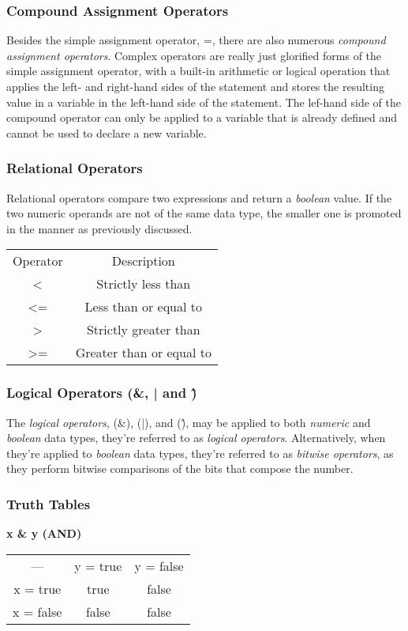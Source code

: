 \documentclass{article}
\begin{document}
\subsubsection{Compound Assignment Operators}
Besides the simple assignment operator, =, there are also numerous \emph{compound assignment operators}. 
Complex operators are really just glorified forms of the simple assignment operator, with a built-in arithmetic or logical operation that applies the left- and right-hand sides of the statement and stores the resulting value in a variable in the left-hand side of the statement.
The lef-hand side of the compound operator can only be applied to a variable that is already defined and cannot be used to declare a new variable.

\subsubsection{Relational Operators}
Relational operators compare two expressions and return a \emph{boolean} value. If the two numeric operands are not of the same data type, the smaller one is promoted in the manner as previously discussed.

\begin{tabular}{|c|c|}
	\cline{1-2}
	Operator & Description \\
	\cline{1-2}
	< & Strictly less than \\
	<= & Less than or equal to \\
	> & Strictly greater than \\
	>= & Greater than or equal to \\
	\cline{1-2}
\end{tabular}

\subsubsection{Logical Operators (\&, | and \^)}
The \emph{logical operators}, (\&), (|), and (\^), may be applied to both \emph{numeric} and \emph{boolean} data types, they're referred to as \emph{logical operators}. 
Alternatively, when they're applied to \emph{boolean} data types, they're referred to as \emph{bitwise operators}, as they perform bitwise comparisons of the bits that compose the number.
\subsubsection{Truth Tables}
\textbf{x \& y (AND)}
\begin{tabular}{|c|c|c|}
	\cline{1-3}
	--- & y = true & y = false \\
	\cline{1-3}
	x = true & true & false \\
	\cline{1-3}
	x = false & false & false \\
	\cline{1-3}
\end{tabular}
\end{document}
